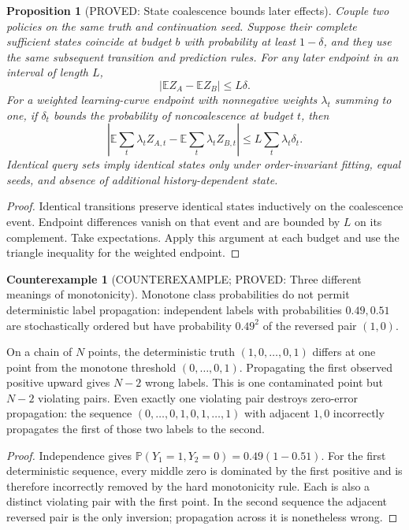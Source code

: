 \documentclass[11pt]{article}
\newcommand{\E}{\mathbb E}
\newtheorem{proposition}[theorem]{Proposition}
\theoremstyle{definition}
\newtheorem{counterexample}[theorem]{Counterexample}
\theoremstyle{remark}
\begin{document}
\begin{proposition}[PROVED: State coalescence bounds later effects]
\label{rthreegeo:coupling}
Couple two policies on the same truth and continuation seed. Suppose
their complete sufficient states coincide at budget $b$ with probability
at least $1-\delta$, and they use the same subsequent transition and
prediction rules. For any later endpoint in an interval of length $L$,
\[
 |\E Z_A-\E Z_B|\le L\delta.
\]
For a weighted learning-curve endpoint with nonnegative weights
$\lambda_t$ summing to one, if $\delta_t$ bounds the probability of
noncoalescence at budget $t$, then
\[
 |\E\textstyle\sum_t\lambda_t Z_{A,t}
       -\E\sum_t\lambda_t Z_{B,t}|
 \le L\sum_t\lambda_t\delta_t.
\]
Identical query sets imply identical states only under order-invariant
fitting, equal seeds, and absence of additional history-dependent state.
\end{proposition}
\begin{proof}
Identical transitions preserve identical states inductively on the
coalescence event. Endpoint differences vanish on that event and are
bounded by $L$ on its complement. Take expectations.
Apply this argument at each budget and use the triangle inequality for
the weighted endpoint.
\end{proof}

\begin{counterexample}[COUNTEREXAMPLE; PROVED: Three different meanings of monotonicity]
\label{rthreegeo:monotone}
Monotone class probabilities do not permit deterministic label
propagation: independent labels with probabilities $0.49,0.51$ are
stochastically ordered but have probability $0.49^2$ of the reversed
pair $(1,0)$.

On a chain of $N$ points, the deterministic truth
$(1,0,\ldots,0,1)$ differs at one point from the monotone threshold
$(0,\ldots,0,1)$. Propagating the first observed positive upward gives
$N-2$ wrong labels. This is one contaminated point but $N-2$ violating
pairs. Even exactly one violating pair destroys zero-error propagation:
the sequence $(0,\ldots,0,1,0,1,\ldots,1)$ with adjacent $1,0$
incorrectly propagates the first of those two labels to the second.
\end{counterexample}
\begin{proof}
Independence gives $\mathbb P(Y_1=1,Y_2=0)=0.49(1-0.51)$.
For the first deterministic sequence, every middle zero is dominated
by the first positive and is therefore incorrectly removed by the
hard monotonicity rule. Each is also a distinct violating pair with
the first point. In the second sequence the adjacent reversed pair is
the only inversion; propagation across it is nonetheless wrong.
\end{proof}
\end{document}
